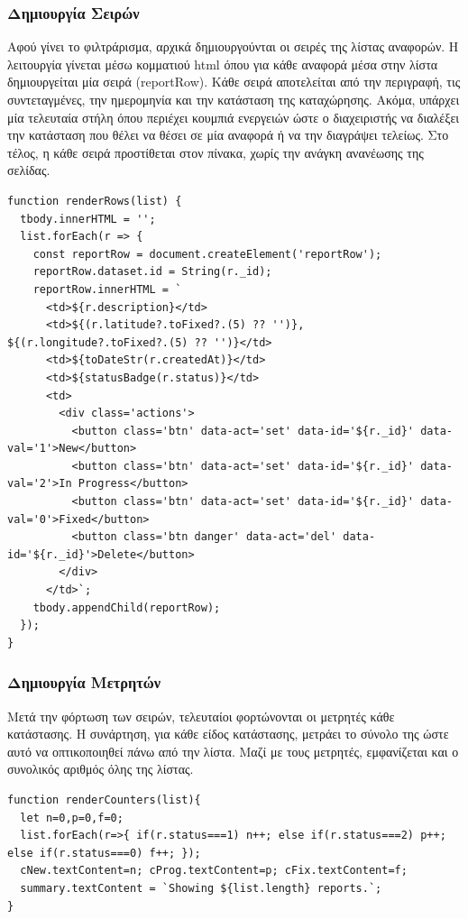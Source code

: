 \subsubsection*{Δημιουργία Σειρών}
Αφού γίνει το φιλτράρισμα, αρχικά δημιουργούνται οι σειρές της λίστας αναφορών. Η λειτουργία γίνεται μέσω κομματιού html όπου για κάθε αναφορά μέσα στην λίστα δημιουργείται μία σειρά (reportRow). Κάθε σειρά αποτελείται από την περιγραφή, τις συντεταγμένες, την ημερομηνία και την κατάσταση της καταχώρησης. Ακόμα, υπάρχει μία τελευταία στήλη όπου περιέχει κουμπιά ενεργειών ώστε ο διαχειριστής να διαλέξει την κατάσταση που θέλει να θέσει σε μία αναφορά ή να την διαγράψει τελείως. Στο τέλος, η κάθε σειρά προστίθεται στον πίνακα, χωρίς την ανάγκη ανανέωσης της σελίδας.
\\
\begin{lstlisting}
function renderRows(list) {
  tbody.innerHTML = '';
  list.forEach(r => {
    const reportRow = document.createElement('reportRow');
    reportRow.dataset.id = String(r._id);
    reportRow.innerHTML = `
      <td>${r.description}</td>
      <td>${(r.latitude?.toFixed?.(5) ?? '')}, ${(r.longitude?.toFixed?.(5) ?? '')}</td>
      <td>${toDateStr(r.createdAt)}</td>
      <td>${statusBadge(r.status)}</td>
      <td>
        <div class='actions'>
          <button class='btn' data-act='set' data-id='${r._id}' data-val='1'>New</button>
          <button class='btn' data-act='set' data-id='${r._id}' data-val='2'>In Progress</button>
          <button class='btn' data-act='set' data-id='${r._id}' data-val='0'>Fixed</button>
          <button class='btn danger' data-act='del' data-id='${r._id}'>Delete</button>
        </div>
      </td>`;
    tbody.appendChild(reportRow);
  });
}
\end{lstlisting}

\subsubsection*{Δημιουργία Μετρητών}
Μετά την φόρτωση των σειρών, τελευταίοι φορτώνονται οι μετρητές κάθε κατάστασης. Η συνάρτηση, για κάθε είδος κατάστασης, μετράει το σύνολο της ώστε αυτό να οπτικοποιηθεί πάνω από την λίστα. Μαζί με τους μετρητές, εμφανίζεται και ο συνολικός αριθμός όλης της λίστας.
\\
\begin{lstlisting}
function renderCounters(list){
  let n=0,p=0,f=0;
  list.forEach(r=>{ if(r.status===1) n++; else if(r.status===2) p++; else if(r.status===0) f++; });
  cNew.textContent=n; cProg.textContent=p; cFix.textContent=f;
  summary.textContent = `Showing ${list.length} reports.`;
}
\end{lstlisting}


